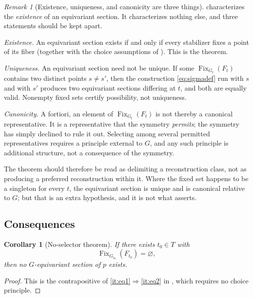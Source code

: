 \documentclass[11pt,reqno]{amsart}
\theoremstyle{plain}
\newtheorem{corollary}[theorem]{Corollary}
\theoremstyle{definition}
\theoremstyle{remark}
\newtheorem{remark}[theorem]{Remark}
\DeclareMathOperator{\Fix}{Fix}
\begin{document}
\begin{remark}[Existence, uniqueness, and canonicity are three things]
\label{rem:notcanonical}
 characterizes the \emph{existence} of an equivariant section. It characterizes nothing else, and three statements should be kept apart.

\emph{Existence.} An equivariant section exists if and only if every stabilizer fixes a point of its fiber (together with the choice assumptions of ). This is the theorem.

\emph{Uniqueness.} An equivariant section need not be unique. If some $\Fix_{G_{t}}(F_{t})$ contains two distinct points $s\neq s'$, then the construction \eqref{eq:sigmadef} run with $s$ and with $s'$ produces two equivariant sections differing at $t$, and both are equally valid. Nonempty fixed sets certify possibility, not uniqueness.

\emph{Canonicity.} A fortiori, an element of $\Fix_{G_{t}}(F_{t})$ is not thereby a canonical representative. It is a representative that the symmetry \emph{permits}; the symmetry has simply declined to rule it out. Selecting among several permitted representatives requires a principle external to $G$, and any such principle is additional structure, not a consequence of the symmetry.

The theorem should therefore be read as delimiting a reconstruction class, not as producing a preferred reconstruction within it. Where the fixed set happens to be a singleton for every $t$, the equivariant section is unique and is canonical relative to $G$; but that is an extra hypothesis, and it is not what  asserts.
\end{remark}

\subsection{Consequences}

\begin{corollary}[No-selector theorem]
\label{cor:noselector}
If there exists $t_{0}\in T$ with
\begin{equation}
\label{eq:emptyfix}
\Fix_{G_{t_{0}}}(F_{t_{0}})=\varnothing,
\end{equation}
then no $G$-equivariant section of $p$ exists.
\end{corollary}

\begin{proof}
This is the contrapositive of \ref{it:eq1}$\Rightarrow$\ref{it:eq2} in , which requires no choice principle.
\end{proof}
\end{document}
